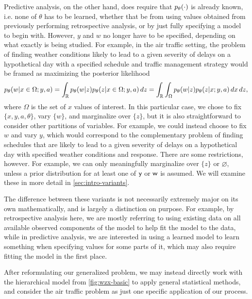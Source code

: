 Predictive analysis, on the other hand, does require that $\pld{\cdot}$ is already known, i.e. none of $\theta$ has to be learned, whether that be from using values obtained from previously performing retrospective analysis, or by just fully specifying a model to begin with. However, $y$ and $w$ no longer have to be specified, depending on what exactly is being studied. For example, in the air traffic setting, the problem of finding weather conditions likely to lead to a given severity of delays on a hypothetical day with a specified schedule and traffic management strategy would be framed as maximizing the posterior likelihood
\begin{equation}
    \label{eq:example-prediction-integral}
    \pld{w\given x\in \Omega; y,a}
    =\int_{\RR} \pld{w\given z}\pld{z\given x\in\Omega;y,a} \,dz
    =\int_{\RR}\int_{\Omega} \pld{w\given z}\pld{z\given x;y,a} \,dx\,dz,
\end{equation}
where $\Omega$ is the set of $x$ values of interest. In this particular case, we chose to fix $\{x,y,a,\theta\}$, vary $\{w\}$, and marginalize over $\{z\}$, but it is also straightforward to consider other partitions of variables. For example, we could instead choose to fix $w$ and vary $y$, which would correspond to the complementary problem of finding schedules that are likely to lead to a given severity of delays on a hypothetical day with specified weather conditions and response. There are some restrictions, however. For example, we can only meaningfully marginalize over $\{z\}$ or $\varnothing$, unless a prior distribution for at least one of $\mathsf y$ or $\mathsf w$ is assumed. We will examine these in more detail in \cref{sec:intro-variants}. 

The difference between these variants is not necessarily extremely major on its own mathematically, and is largely a distinction on purpose. For example, by retrospective analysis here, we are mostly referring to using existing data on all available observed components of the model to help fit the model to the data, while in predictive analysis, we are interested in using a learned model to learn something when specifying values for some parts of it, which may also require fitting the model in the first place.

After reformulating our generalized problem, we may instead directly work with the hierarchical model from \cref{fig:wzx-basic} to apply general statistical methods, and consider the air traffic problem as just one specific application of our process. 


